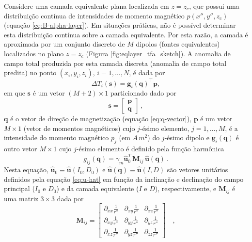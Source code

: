 Considere uma camada equivalente plana localizada em $z = z_{c}$, que possui uma distribuição 
contínua de intensidades de momento magnético $p(x'',y'',z_{c})$ (equação \ref{eq:B-alpha-layer}). 
Em situações práticas, não é possível determinar esta distribuição contínua sobre a camada equivalente. 
Por esta razão, a camada é aproximada por um conjunto discreto de $M$ dipolos (fontes equivalentes) 
localizados no plano $z = z_{c}$ (Figura \ref{fig:eqlayer_tfa_sketch}). 
A anomalia de campo total produzida por esta camada 
discreta (anomalia de campo total predita) no ponto $(x_{i},y_{i},z_{i})$, $i=1,\dots,N$, é dada por 
\begin{equation}
\Delta T_{i}(\mathbf{s}) = \mathbf{g}_{i}(\mathbf{q})^{\top} \mathbf{p},
\label{eq:tfa-pred-i}
\end{equation}
em que $\mathbf{s}$ é um vetor $(M + 2) \times 1$ particionado dado por 
\begin{equation}
      \mathbf{s} = \begin{bmatrix}
		\mathbf{p} \\
		\mathbf{q}
	\end{bmatrix} \: ,
	\label{eq:s-vector}
\end{equation}
$\mathbf{q}$ é o vetor de direção de magnetização (equação \ref{eq:q-vector}), 
$\mathbf{p}$ é um vetor $M \times 1$ (vetor de momentos magnéticos) cujo $j$-ésimo elemento, $j=1,\dots,M$, 
é a intensidade do momento magnético $p_{j}$ (em $A \, m^{2}$) do $j$-ésimo dipolo e 
$\mathbf{g}_{i} (\mathbf{q})$ é outro vetor $M \times 1$ cujo $j$-ésimo elemento é definido pela 
função harmônica 
\begin{equation}
g_{ij} (\mathbf{q})  = \gamma_{m} \hat{\mathbf{u}}_{0}^T \, 
\mathbf{M}_{ij} \, \hat{\mathbf{u}}(\mathbf{q}) \: .
\label{eq:g_ij}
\end{equation}
Nesta equação, $\hat{\mathbf{u}}_{0} \equiv \hat{\mathbf{u}}(I_{0}, D_{0})$ e 
$\hat{\mathbf{u}}(\mathbf{q}) \equiv \hat{\mathbf{u}}(I, D)$ são vetores unitários
definidos pela equação \ref{eq:u-hat} em função da inclinação e declinação do 
campo principal ($I_{0}$ e $D_{0}$) e da camada equivalente ($I$ e $D$),
respectivamente, e $\mathbf{M}_{ij}$ é uma matriz $3 \times 3$ dada por 
\begin{equation}
\mathbf{M}_{ij} = \begin{bmatrix}
\partial_{xx} \frac{1}{r''} & 
\partial_{xy} \frac{1}{r''} &
\partial_{xz} \frac{1}{r''} \\
\partial_{xy} \frac{1}{r''} & 
\partial_{yy} \frac{1}{r''} &
\partial_{yz} \frac{1}{r''} \\
\partial_{xz} \frac{1}{r''} & 
\partial_{yz} \frac{1}{r''} &
\partial_{zz} \frac{1}{r''}
\end{bmatrix} \quad ,
\label{eq:Mij-matrix}
\end{equation}
